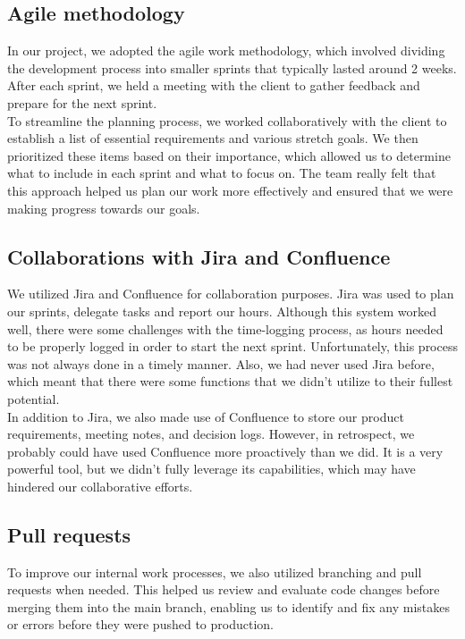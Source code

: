 \subsection{Agile methodology}

In our project, we adopted the agile work methodology, which involved dividing the development process into smaller sprints that typically lasted around 2 weeks. After each sprint, we held a meeting with the client to gather feedback and prepare for the next sprint.\\

\noindent
To streamline the planning process, we worked collaboratively with the client to establish a list of essential requirements and various stretch goals. We then prioritized these items based on their importance, which allowed us to determine what to include in each sprint and what to focus on. The team really felt that this approach helped us plan our work more effectively and ensured that we were making progress towards our goals. 



\subsection{Collaborations with Jira and Confluence}

We utilized Jira and Confluence for collaboration purposes. Jira was used to plan our sprints, delegate tasks and report our hours. Although this system worked well, there were some challenges with the time-logging process, as hours needed to be properly logged in order to start the next sprint. Unfortunately, this process was not always done in a timely manner. Also, we had never used Jira before, which meant that there were some functions that we didn't utilize to their fullest potential.\\

\noindent
In addition to Jira, we also made use of Confluence to store our product requirements, meeting notes, and decision logs. However, in retrospect, we probably could have used Confluence more proactively than we did. It is a very powerful tool, but we didn't fully leverage its capabilities, which may have hindered our collaborative efforts.


\subsection{Pull requests}
To improve our internal work processes, we also utilized branching and pull requests when needed. This helped us review and evaluate code changes before merging them into the main branch, enabling us to identify and fix any mistakes or errors before they were pushed to production.\\


